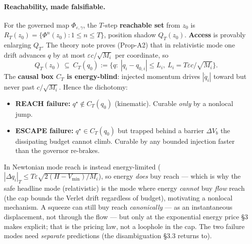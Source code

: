 \documentclass[11pt]{article}
\begin{document}
\paragraph{Reachability, made falsifiable.} For the governed map $\Phi_{\varepsilon,\gamma}$, the $T$-step \textbf{reachable set} from $z_0$ is $R_T(z_0)=\{\Phi^n(z_0):1\le n\le T\}$, position shadow $Q_T(z_0)$. \textbf{Access} is provably enlarging $Q_T$. The theory note proves (Prop-A2) that in relativistic mode one drift advances $q$ by at most $\varepsilon c/\sqrt{M_i}$ per coordinate, so
\[
Q_T(z_0)\ \subseteq\ C_T(q_0):=\{q:\ |q_i-q_{0,i}|\le L_i,\ L_i=T\varepsilon c/\sqrt{M_i}\}.
\]
The \textbf{causal box $C_T$ is energy-blind}: injected momentum drives $|\dot q_i|$ toward but never past $c/\sqrt{M_i}$. Hence the dichotomy:
\begin{itemize}\itemsep1pt
\item \textbf{REACH failure:} $q^\star\notin C_T(q_0)$ (kinematic). Curable \emph{only} by a nonlocal jump.
\item \textbf{ESCAPE failure:} $q^\star\in C_T(q_0)$ but trapped behind a barrier $\Delta V_b$ the dissipating budget cannot climb. Curable by any bounded injection faster than the governor re-brakes.
\end{itemize}
In Newtonian mode reach is instead energy-limited ($|\Delta q_i|_T\le T\varepsilon\sqrt{2(H-V_{\min})/M_i}$), so energy \emph{does} buy reach --- which is why the safe headline mode (relativistic) is the mode where energy \emph{cannot} buy \emph{flow} reach (the cap bounds the Verlet drift regardless of budget), motivating a nonlocal mechanism. A squeeze can still buy reach \emph{canonically} --- as an instantaneous displacement, not through the flow --- but only at the exponential energy price \S3 makes explicit; that is the pricing law, not a loophole in the cap. The two failure modes need \emph{separate} predictions (the disambiguation \S3.3 returns to).
\end{document}
